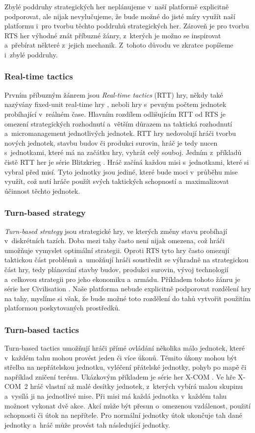 Zbylé poddruhy strategických her neplánujeme v~naší platformě explicitně podporovat, ale nijak nevylučujeme, že bude možné do jisté míry využít naší platformu i~pro tvorbu těchto poddruhů strategických her. Zároveň je pro tvorbu RTS her výhodné znát příbuzné žánry, z~kterých je možno se inspirovat a~přebírat některé z~jejich mechanik. Z~tohoto důvodu ve zkratce popíšeme i~zbylé poddruhy.

\subsubsection{Real-time tactics}
Prvním příbuzným žánrem jsou \emph{Real-time tactics} (RTT) hry, někdy také nazývány fixed-unit real-time hry \citep{site:stratg02}, neboli hry s~pevným počtem jednotek probíhající v~reálném čase. Hlavním rozdílem odlišujícím RTT od RTS je omezení strategických rozhodnutí a~větším důrazem na taktická rozhodnutí a~micromanagement jednotlivých jednotek. RTT hry nedovolují hráči tvorbu nových jednotek, stavbu budov či produkci surovin, hráč je tedy nucen s~jednotkami, které má na začátku hry, vyhrát celý souboj.  Jedním z~příkladů čistě RTT her je série Blitzkrieg \citep{site:blitzkrieg}. Hráč začíná každou misi s~jednotkami, které si vybral před misí. Tyto jednotky jsou jediné, které bude moci v~průběhu mise využít, což nutí hráče použít svých taktických schopností a~maximalizovat účinnost těchto jednotek. 

\subsubsection{Turn-based strategy}
\emph{Turn-based strategy} jsou strategické hry, ve kterých změny stavu probíhají v~diskrétních tazích. Doba mezi tahy často není nijak omezena, což hráči umožňuje vymyslet optimální strategii. Oproti RTS tyto hry často omezují taktickou část problémů a~umožňují hráči soustředit se výhradně na strategickou část hry, tedy plánování stavby budov, produkci surovin, vývoj technologií a~celkovou strategii pro jeho ekonomiku a~armádu. Příkladem tohoto žánru je série her Civilisation \citep{site:civ5}. Naše platforma nebude explicitně podporovat rozdělení hry na tahy, myslíme si však, že bude možné toto rozdělení do tahů vytvořit použitím platformou poskytovaných prostředků.

\subsubsection{Turn-based tactics}
Turn-based tactics umožňují hráči přímé ovládání několika málo jednotek, které v~každém tahu mohou provést jeden či více úkonů. Těmito úkony mohou být střelba na nepřátelskou jednotku, vyléčení přátelské jednotky, pohyb po mapě či například zničení terénu. Ukázkovým příkladem je série her X-COM \citep{site:XCOM}. Ve hře X-COM~2 hráč vlastní až malé desítky jednotek, z~kterých vybírá malou skupinu a~vysílá ji na jednotlivé mise. Při misi má každá jednotka v~každém tahu možnost vykonat dvě akce. Akcí může být přesun o~omezenou vzdálenost, použití schopnosti či útok na nepřítele. Pro normální jednotky útok ukončuje tah dané jednotky a~hráč může provést tah následující jednotky. 

